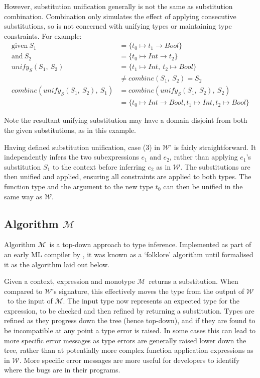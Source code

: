 \documentclass[a4paper,fleqn,oneside,12pt]{report}
\newcommand{\W}{$\mathcal{W}$}
\newcommand{\M}{$\mathcal{M}$}
\begin{document}
However, substitution unification generally is not the same as substitution combination. Combination only simulates the effect of applying consecutive substitutions, so is not concerned with unifying types or maintaining type constraints. For example:
\begin{align*}
  \mathrm{given}\ S_1                        & = \{ t_0 \mapsto t_1 \rightarrow Bool \}\\
  \mathrm{and}\ S_2                          & = \{ t_0 \mapsto Int \rightarrow t_2 \}\\[0.25cm]
  \mathit{unify_S}(S_1,\ S_2)                & = \{ t_1 \mapsto Int,\ t_2 \mapsto Bool \}\\
                                             & \neq \mathit{combine}(S_1,\ S_2) = S_2\\[0.25cm]
  combine(\mathit{unify_S}(S_1,\ S_2),\ S_1) & = combine(\mathit{unify_S}(S_1,\ S_2),\ S_2)\\
                                             & = \{ t_0 \mapsto Int \rightarrow Bool, t_1 \mapsto Int, t_2 \mapsto Bool \}
\end{align*}

Note the resultant unifying substitution may have a domain disjoint from both the given substitutions, as in this example.

Having defined substitution unification, case (3) in \W' is fairly straightforward. It independently infers the two subexpressions $e_1$ and $e_2$, rather than applying $e_1$'s substitution $S_1$ to the context before inferring $e_2$ as in \W. The substitutions are then unified and applied, ensuring all constraints are applied to both types. The function type and the argument to the new type $t_0$ can then be unified in the same way as \W.

\subsection{Algorithm \texorpdfstring{\M}{M}}

Algorithm \M\ is a top-down approach to type inference. Implemented as part of an early ML compiler by \cite{ref32}, it was known as a `folklore' algorithm until \cite{ref33} formalised it as the algorithm laid out below.

Given a context, expression and monotype \M\ returns a substitution. When compared to \W's signature, this effectively moves the type from the output of \W\ to the input of \M. The input type now represents an expected type for the expression, to be checked and then refined by returning a substitution. Types are refined as they progress down the tree (hence top-down), and if they are found to be incompatible at any point a type error is raised. In some cases this can lead to more specific error messages as type errors are generally raised lower down the tree, rather than at potentially more complex function application expressions as in \W. More specific error messages are more useful for developers to identify where the bugs are in their programs.
\end{document}
